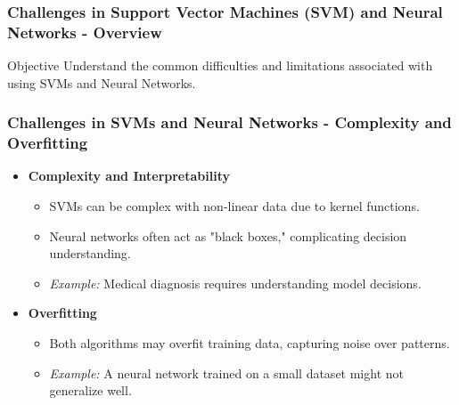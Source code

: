 \documentclass[aspectratio=169]{beamer}
\begin{document}
\begin{frame}[fragile]
    \frametitle{Challenges in Support Vector Machines (SVM) and Neural Networks - Overview}
    \begin{block}{Objective}
        Understand the common difficulties and limitations associated with using SVMs and Neural Networks.
    \end{block}
\end{frame}

\begin{frame}[fragile]
    \frametitle{Challenges in SVMs and Neural Networks - Complexity and Overfitting}
    \begin{itemize}
        \item \textbf{Complexity and Interpretability}
        \begin{itemize}
            \item SVMs can be complex with non-linear data due to kernel functions.
            \item Neural networks often act as "black boxes," complicating decision understanding.
            \item \textit{Example:} Medical diagnosis requires understanding model decisions.
        \end{itemize}
        \item \textbf{Overfitting}
        \begin{itemize}
            \item Both algorithms may overfit training data, capturing noise over patterns.
            \item \textit{Example:} A neural network trained on a small dataset might not generalize well.
        \end{itemize}
    \end{itemize}
\end{frame}
\end{document}
